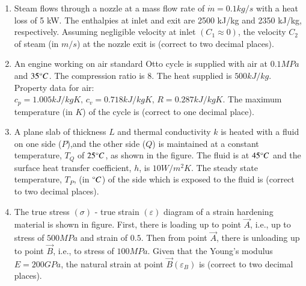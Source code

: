 \documentclass[journal]{IEEEtran}
\begin{document}
\begin{enumerate}
    \item Steam flows through a nozzle at a mass flow rate of $\dot{m}=0.1kg/s$ with a heat loss of 5 kW. The enthalpies at inlet and exit are 2500 kJ/kg and 2350 kJ/kg, respectively. Assuming
        negligible velocity at inlet $(C_1\approx0)$, the velocity $C_2$ of steam (in $m/s$) at the nozzle exit is \underline{\hspace{1cm}} (correct to two decimal places).
        \begin{figure}[!ht]
            \centering
            
        \end{figure}

    \item An engine working on air standard Otto cycle is supplied with air at $0.1 MPa$ and $35\degree C$. The compression ratio is $8$. The heat supplied is $500 kJ/kg$. Property data for air: $c_p = 1.005 kJ/kg K,\,c_v = 0.718 kJ/kg K,\,R = 0.287 kJ/kg K$. The maximum temperature (in $K$) of the cycle is \underline{\hspace{1cm}} (correct to one decimal place).

    \item A plane slab of thickness $L$ and thermal conductivity $k$ is heated with a fluid on one side ($P$),and the other side ($Q$) is maintained at a constant temperature, $T_{Q}$ of $25\degree C$, as shown in the figure. The fluid is at $45\degree C$ and the surface heat transfer coefficient, $h$, is $10 W/m^2K$. The steady state temperature, $T_{P}$, (in $\degree C$) of the side which is exposed to the fluid is \underline{\hspace{1cm}} (correct to two decimal places).
        \begin{figure}[!ht]
            \centering
            
        \end{figure}

    \item The true stress $(\sigma)$ - true strain $(\varepsilon)$ diagram of a strain hardening material is shown in figure. First, there is loading up to point $\vec{A}$, i.e., up to stress of $500 MPa$ and strain of $0.5$. Then from point $\vec{A}$, there is unloading up to point $\vec{B}$, i.e., to stress of $100 MPa$. Given that the Young's modulus $E = 200 GPa$, the natural strain at point $\vec{B} (\varepsilon_{B})$ is \underline{\hspace{1cm}} (correct to two decimal places).
        \begin{figure}[!ht]
            \centering
            
        \end{figure}


\end{enumerate}
\end{document}
